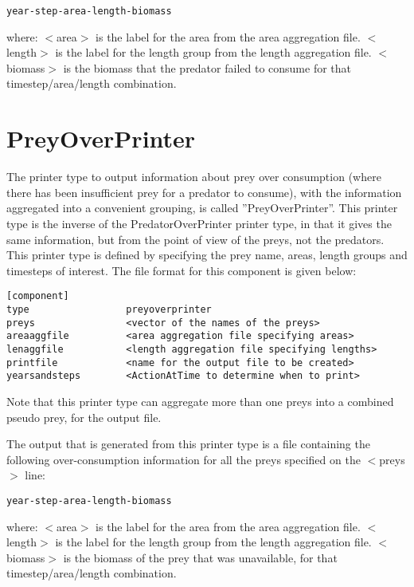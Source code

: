 \documentclass [a4paper, 10pt]{book}
\begin{document}
{\small\begin{verbatim}
year-step-area-length-biomass
\end{verbatim}}

where:\newline
$<$area$>$ is the label for the area from the area aggregation file.\newline
$<$length$>$ is the label for the length group from the length aggregation file.\newline
$<$biomass$>$ is the biomass that the predator failed to consume for that timestep/area/length combination.

\section{PreyOverPrinter}\label{sec:preyoverprinter}
The printer type to output information about prey over consumption (where there has been insufficient prey for a predator to consume), with the information aggregated into a convenient grouping, is called ''PreyOverPrinter''.  This printer type is the inverse of the PredatorOverPrinter printer type, in that it gives the same information, but from the point of view of the preys, not the predators.  This printer type is defined by specifying the prey name, areas, length groups and timesteps of interest.  The file format for this component is given below:

{\small\begin{verbatim}
[component]
type                 preyoverprinter
preys                <vector of the names of the preys>
areaaggfile          <area aggregation file specifying areas>
lenaggfile           <length aggregation file specifying lengths>
printfile            <name for the output file to be created>
yearsandsteps        <ActionAtTime to determine when to print>
\end{verbatim}}

Note that this printer type can aggregate more than one preys into a combined pseudo prey, for the output file.

\bigskip
The output that is generated from this printer type is a file containing the following over-consumption information for all the preys specified on the $<$preys$>$ line:

{\small\begin{verbatim}
year-step-area-length-biomass
\end{verbatim}}

where:\newline
$<$area$>$ is the label for the area from the area aggregation file.\newline
$<$length$>$ is the label for the length group from the length aggregation file.\newline
$<$biomass$>$ is the biomass of the prey that was unavailable, for that timestep/area/length combination.
\end{document}
